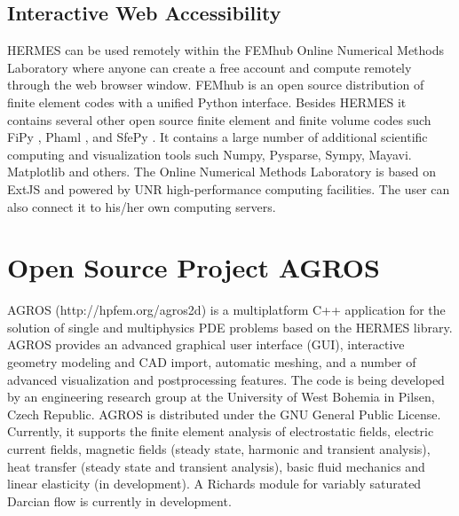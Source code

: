 \documentclass[final,3p,times,twocolumn]{elsarticle}
\begin{document}
\subsection{Interactive Web Accessibility}
\label{sec:onlinelab}

HERMES can be used remotely within the FEMhub Online Numerical Methods Laboratory
\cite{onlinelab} where anyone can create a free account and compute remotely 
through the web browser window. FEMhub \cite{femhub} is an open source distribution 
of finite element codes with a unified Python interface.
Besides HERMES it contains several other open source finite element and finite volume 
codes such FiPy \cite{fipy}, Phaml \cite{phaml}, and SfePy \cite{sfepy}.
It contains a large number of additional scientific computing and visualization 
tools such Numpy, Pysparse, Sympy, Mayavi. Matplotlib and others.   
The Online Numerical Methods Laboratory is based on ExtJS and powered 
by UNR high-performance computing facilities. The user can also connect 
it to his/her own computing servers.  

\section{Open Source Project AGROS}
\label{sec:agros}

AGROS (http://hpfem.org/agros2d) is a multiplatform C++ application for the solution 
of single and multiphysics PDE problems based on the HERMES library. AGROS provides 
an advanced graphical user interface (GUI), interactive geometry modeling and CAD import, 
automatic meshing, and a number of advanced visualization and postprocessing features. 
The code is being developed by an engineering research group at the University of West 
Bohemia in Pilsen, Czech Republic. AGROS is distributed under the GNU General Public 
License. Currently, it supports the finite element analysis of electrostatic fields,
electric current fields, magnetic fields (steady state, harmonic and transient analysis),
heat transfer (steady state and transient analysis), basic fluid mechanics and linear 
elasticity (in development). A Richards module for variably saturated Darcian %
flow is currently in development. 
\end{document}
